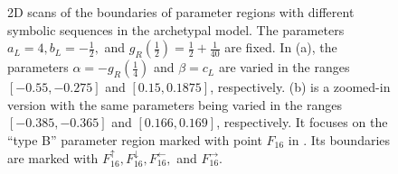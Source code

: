 \begin{figure}
	\centering
	\caption[2D scans of the boundaries of parameter regions with different symbolic sequences in the archetypal model]{
		2D scans of the boundaries of parameter regions with different symbolic sequences in the archetypal model.
		The parameters $a_L = 4, b_L = -\frac{1}{2},$ and $g_R\left(\frac{1}{2}\right) = \frac{1}{2} + \frac{1}{40}$ are fixed.
		In (a), the parameters $\alpha = -g_R\left(\frac{1}{4}\right)$ and $\beta = c_L$ are varied in the ranges $[-0.55, -0.275]$ and $[0.15, 0.1875]$, respectively.
		(b) is a zoomed-in version with the same parameters being varied in the ranges $[-0.385, -0.365]$ and $[0.166, 0.169]$, respectively.
		It focuses on the ``type B'' parameter region marked with point $F_{16}$ in .
		Its boundaries are marked with $F_{16}^\uparrow, F_{16}^\downarrow, F_{16}^\leftarrow,$ and $F_{16}^\rightarrow$.
	}
	\label{fig:arch.dyn.regions}
\end{figure}

